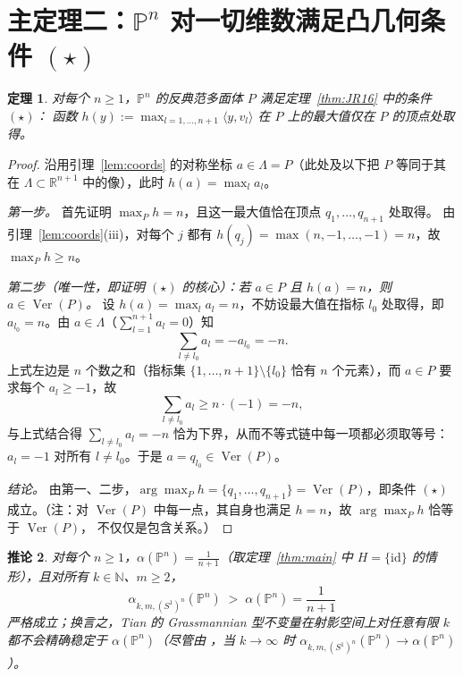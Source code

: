 \documentclass[11pt,a4paper]{article}
\newtheorem{theorem}{定理}[section]
\newtheorem{corollary}[theorem]{推论}
\theoremstyle{definition}
\theoremstyle{remark}
\DeclareMathOperator{\Ver}{Ver}
\newcommand{\R}{\mathbb{R}}
\newcommand{\N}{\mathbb{N}}
\newcommand{\PP}{\mathbb{P}}
\begin{document}
\section{主定理二：$\PP^n$ 对一切维数满足凸几何条件 $(\star)$}

\begin{theorem}\label{thm:starcond}
对每个 $n \ge 1$，$\PP^n$ 的反典范多面体 $P$ 满足定理~\ref{thm:JR16} 中的条件 $(\star)$：
函数 $h(y) := \max_{l=1,\dots,n+1}\langle y, v_l\rangle$ 在 $P$ 上的最大值\emph{仅}在
$P$ 的顶点处取得。
\end{theorem}

\begin{proof}
沿用引理~\ref{lem:coords} 的对称坐标 $a \in \Lambda = P$（此处及以下把 $P$ 等同于其在
$\Lambda \subset \R^{n+1}$ 中的像），此时 $h(a) = \max_l a_l$。

\emph{第一步。} 首先证明 $\max_P h = n$，且这一最大值恰在顶点 $q_1,\dots,q_{n+1}$ 处取得。
由引理~\ref{lem:coords}(iii)，对每个 $j$ 都有
$h(q_j) = \max(n,-1,\dots,-1) = n$，故 $\max_P h \ge n$。

\emph{第二步（唯一性，即证明 $(\star)$ 的核心）：若 $a \in P$ 且 $h(a) = n$，则 $a \in \Ver(P)$。}
设 $h(a) = \max_l a_l = n$，不妨设最大值在指标 $l_0$ 处取得，即 $a_{l_0} = n$。由
$a \in \Lambda$（$\sum_{l=1}^{n+1} a_l = 0$）知
\[
  \sum_{l \ne l_0} a_l = -a_{l_0} = -n.
\]
上式左边是 $n$ 个数之和（指标集 $\{1,\dots,n+1\}\setminus\{l_0\}$ 恰有 $n$ 个元素），而 $a\in P$
要求每个 $a_l \ge -1$，故
\[
  \sum_{l \ne l_0} a_l \ge n \cdot (-1) = -n,
\]
与上式结合得 $\sum_{l\ne l_0} a_l = -n$ 恰为下界，从而不等式链中每一项都必须取等号：
$a_l = -1$ 对所有 $l \ne l_0$。于是 $a = q_{l_0} \in \Ver(P)$。

\emph{结论。} 由第一、二步，$\arg\max_P h = \{q_1,\dots,q_{n+1}\} = \Ver(P)$，即条件 $(\star)$
成立。（注：对 $\Ver(P)$ 中每一点，其自身也满足 $h=n$，故 $\arg\max_P h$ 恰等于 $\Ver(P)$，
不仅仅是包含关系。）
\end{proof}

\begin{corollary}\label{cor:gras}
对每个 $n \ge 1$，$\alpha(\PP^n) = \frac{1}{n+1}$（取定理~\ref{thm:main} 中 $H=\{\mathrm{id}\}$
的情形），且对所有 $k \in \N$、$m \ge 2$，
\[
  \alpha_{k,m,(S^1)^n}(\PP^n) \;>\; \alpha(\PP^n) = \frac{1}{n+1}
\]
严格成立；换言之，Tian 的 Grassmannian 型不变量在射影空间上对任意有限 $k$ 都\emph{不会}精确稳定于
$\alpha(\PP^n)$（尽管由 \cite[Proposition~7.10]{JR2025}，当 $k \to \infty$ 时 $\alpha_{k,m,(S^1)^n}(\PP^n)
\to \alpha(\PP^n)$）。
\end{corollary}
\end{document}

